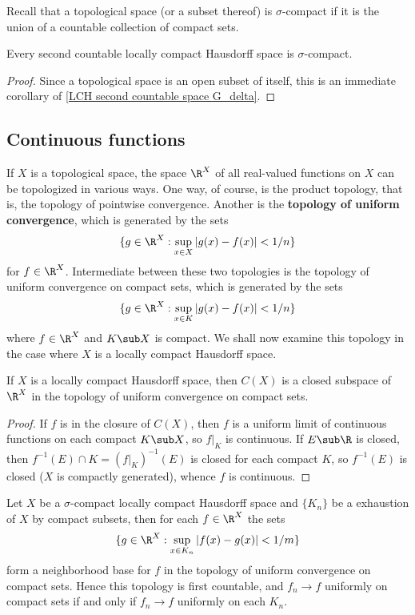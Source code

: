 Recall that a topological space (or a subset thereof) is $\sigma$-compact if it is the union of a countable collection of compact sets.
\begin{corollary}
Every second countable locally compact Hausdorff space is $\sigma$-compact.
\end{corollary}
\begin{proof}
Since a topological space is an open subset of itself, this is an immediate corollary of \cref{LCH second countable space G_delta}.
\end{proof}
\subsection{Continuous functions}
If $X$ is a topological space, the space $\R^X$ of all real-valued functions on $X$ can be topologized in various ways. One way, of course, is the product topology, that is, the topology of pointwise convergence. Another is the \textbf{topology of uniform convergence}, which is generated by the sets
\[\{g\in\R^X:\sup_{x\in X}|g(x)-f(x)|<1/n\}\]
for $f\in\R^X$. Intermediate between these two topologies is the topology of uniform convergence on compact sets, which is generated by the sets
\[\{g\in\R^X:\sup_{x\in K}|g(x)-f(x)|<1/n\}\]
where $f\in\R^X$ and $K\sub X$ is compact. We shall now examine this topology in the case where $X$ is a locally compact Hausdorff space.
\begin{proposition}\label{LCH C(X) closed subspace}
If $X$ is a locally compact Hausdorff space, then $C(X)$ is a closed subspace of $\R^X$ in the topology of uniform convergence on compact sets.
\end{proposition}
\begin{proof}
If $f$ is in the closure of $C(X)$, then $f$ is a uniform limit of continuous functions on each compact $K\sub X$, so $f|_K$ is continuous. If $E\sub\R$ is closed, then $f^{-1}(E)\cap K=(f|_K)^{-1}(E)$ is closed for each compact $K$, so $f^{-1}(E)$ is closed ($X$ is compactly generated), whence $f$ is continuous.
\end{proof}
\begin{proposition}\label{LCH sigma-compact uniform converge on compact iff}
Let $X$ be a $\sigma$-compact locally compact Hausdorff space and $\{K_n\}$ be a exhaustion of $X$ by compact subsets, then for each $f\in\R^X$ the sets
\[\{g\in\R^X:\sup_{x\in K_n}|f(x)-g(x)|<1/m\}\]
form a neighborhood base for $f$ in the topology of uniform convergence on compact sets. Hence this topology is first countable, and $f_n\to f$ uniformly on compact sets if and only if $f_n\to f$ uniformly on each $K_n$.
\end{proposition}
